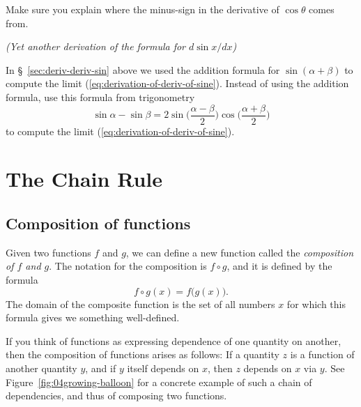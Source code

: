\begin{multicols}{2}
Make sure you explain where the minus-sign in the derivative of $\cos\theta$ comes from.




\problem \groupproblem \textit{(Yet another derivation of the formula for 
$d\sin x / dx$)}




In \S~\ref{sec:deriv-deriv-sin} above we used the addition formula for
$\sin(\alpha+\beta)$ to compute the limit
(\ref{eq:derivation-of-deriv-of-sine}).  Instead of using the addition
formula, use this formula from trigonometry
\[
\sin\alpha - \sin\beta
=
2\sin \bigl(\frac{\alpha-\beta} {2}\bigr) \cos\bigl(\frac{\alpha+\beta} {2}\bigr)
\]
to compute the limit (\ref{eq:derivation-of-deriv-of-sine}).




\end{multicols}












\noproblemfont
\section{The Chain Rule} 
\subsection{Composition of functions} 
Given two functions $f$ and $g$, we can define a new function called
the \emph{composition of $f$ and $g$}.  The notation for the
composition is $f\circ g$, and it is defined by the formula
\[
f\circ g(x)  = f\bigl(g(x)\bigr).
\]
The domain of the composite function is the set of all numbers $x$ for which
this formula gives we something well-defined.




If you think of functions as expressing dependence of one quantity on another,
then the composition of functions arises as follows:  If a quantity $z$ is a
function of another quantity $y$, and if $y$ itself depends on $x$, then $z$
depends on $x$ via $y$.  See Figure~\ref{fig:04growing-balloon} for a concrete
example of such a chain of dependencies, and thus of composing two functions.












